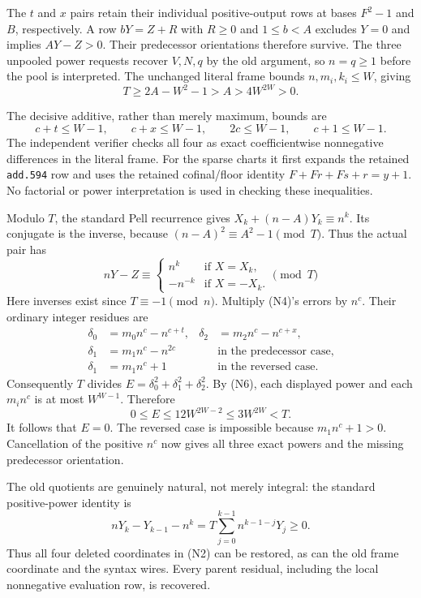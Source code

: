 The $t$ and $x$ pairs retain their individual positive-output rows at bases
$F^2-1$ and $B$, respectively. A row $bY=Z+R$ with $R\ge0$ and
$1\le b<A$ excludes $Y=0$ and implies $AY-Z>0$. Their predecessor
orientations therefore survive. The three unpooled power requests recover
$V,N,q$ by the old argument, so $n=q\ge1$ before the pool is interpreted.
The unchanged literal frame bounds $n,m_i,k_i\le W$, giving
\[
 T\ge2A-W^2-1>A>4W^{2W}>0.                              \tag{N5}
\]

The decisive additive, rather than merely maximum, bounds are
\[
 c+t\le W-1,\qquad c+x\le W-1,\qquad
 2c\le W-1,\qquad c+1\le W-1.                          \tag{N6}
\]
The independent verifier checks all four as exact coefficientwise
nonnegative differences in the literal frame. For the sparse charts it
first expands the retained \texttt{add.594} row and uses the retained
cofinal/floor identity $F+Fr+Fs+r=y+1$. No factorial or power interpretation
is used in checking these inequalities.

Modulo $T$, the standard Pell recurrence gives
$X_k+(n-A)Y_k\equiv n^k$. Its conjugate is the inverse, because
$(n-A)^2\equiv A^2-1\pmod T$. Thus the actual pair has
\[
 nY-Z\equiv
 \begin{cases}
 n^k&\text{if }X=X_k,\\
 -n^{-k}&\text{if }X=-X_k.
 \end{cases}
 \pmod T
\]
Here inverses exist since $T\equiv-1\pmod n$. Multiply (N4)'s errors by
$n^c$. Their ordinary integer residues are
\begin{align*}
 \delta_0&=m_0n^c-n^{c+t},&
 \delta_2&=m_2n^c-n^{c+x},\\
 \delta_1&=m_1n^c-n^{2c}&&\text{in the predecessor case},\\
 \delta_1&=m_1n^c+1&&\text{in the reversed case}.
\end{align*}
Consequently $T$ divides $E=\delta_0^2+\delta_1^2+\delta_2^2$.
By (N6), each displayed power and each $m_i n^c$ is at most $W^{W-1}$.
Therefore
\[
 0\le E\le12W^{2W-2}\le3W^{2W}<T.
\]
It follows that $E=0$. The reversed case is impossible because
$m_1n^c+1>0$. Cancellation of the positive $n^c$ now gives all three
exact powers and the missing predecessor orientation.

The old quotients are genuinely natural, not merely integral: the standard
positive-power identity is
\[
 nY_k-Y_{k-1}-n^k
 =T\sum_{j=0}^{k-1}n^{k-1-j}Y_j\ge0.
\]
Thus all four deleted coordinates in (N2) can be restored, as can the
old frame coordinate and the syntax wires. Every parent residual,
including the local nonnegative evaluation row, is recovered.

